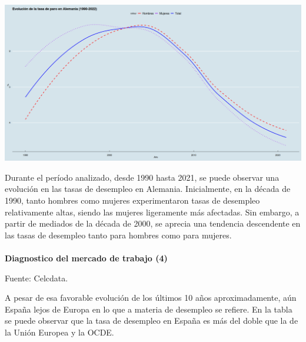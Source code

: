     \begin{center}
	\includegraphics[scale=.32]{image/b3ej4a.png}
    \end{center}

    Durante el período analizado, desde 1990 hasta 2021, se puede observar una evolución en las tasas de desempleo en Alemania. Inicialmente, en la década de 1990, tanto hombres como mujeres experimentaron tasas de desempleo relativamente altas, siendo las mujeres ligeramente más afectadas. Sin embargo, a partir de mediados de la década de 2000, se aprecia una tendencia descendente en las tasas de desempleo tanto para hombres como para mujeres.\\\\

\textbf{Diagnostico del mercado de trabajo (4)}

    \begin{table}[htbp]
      \centering
      \begin{center}
      \end{center}
      \label{tab:addlabel}%
      \begin{center}
      \tiny Fuente: Celcdata.
      \end{center}
    \end{table}
    A pesar de esa favorable evolución de los últimos 10 años aproximadamente, aún España lejos de Europa en lo que a materia de desempleo se refiere. En la tabla se puede observar que la tasa de desempleo en España es más del doble que la de la Unión Europea y la OCDE.\\\\
    \vspace{.5cm}


